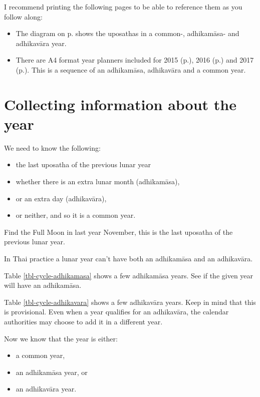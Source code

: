 \documentclass[11pt,oneside]{memoir-article}
\begin{document}
I recommend printing the following pages to be able to reference them as you follow along:

\begin{itemize}
\item The diagram on p.\pageref{dia-common-adhikamasa-adhikavara} shows the
uposathas in a common-, adhikamāsa- and adhikavāra year.
\item There are A4 format year planners included for 2015 (p.\pageref{year-2015}),
2016 (p.\pageref{year-2016}) and 2017 (p.\pageref{year-2017}). This is a
sequence of an adhikamāsa, adhikavāra and a common year.
\end{itemize}

\section{Collecting information about the year}
\label{sec-1-1}

We need to know the following:

\begin{itemize}
\item the last uposatha of the previous lunar year
\item whether there is an extra lunar month (adhikamāsa),
\item or an extra day (adhikavāra),
\item or neither, and so it is a common year.
\end{itemize}

Find the Full Moon in last year November, this is the last uposatha of the
previous lunar year.

In Thai practice a lunar year can't have both an adhikamāsa and an adhikavāra.

Table \ref{tbl-cycle-adhikamasa} shows a few adhikamāsa years. See if the given
year will have an adhikamāsa.

Table \ref{tbl-cycle-adhikavara} shows a few adhikavāra years. Keep in mind that
this is provisional. Even when a year qualifies for an adhikavāra, the calendar
authorities may choose to add it in a different year.

Now we know that the year is either:

\begin{itemize}
\item a common year,
\item an adhikamāsa year, or
\item an adhikavāra year.
\end{itemize}
\end{document}
